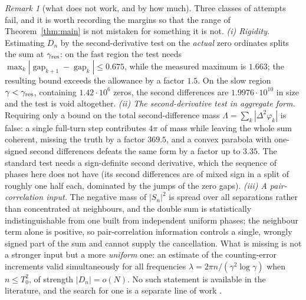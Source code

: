 \documentclass[11pt]{article}
\theoremstyle{remark}
\newtheorem{remark}[theorem]{Remark}
\begin{document}
\begin{remark}[what does not work, and by how much]\label{rem:negative}
Three classes of attempts fail, and it is worth recording the margins so that the range of
Theorem~\ref{thm:main} is not mistaken for something it is not.
\emph{(i) Rigidity.} Estimating $D_n$ by the second-derivative test on the \emph{actual} zero
ordinates splits the sum at $\gamma_{\rm res}$: on the fast region the test needs
$\max_k|\operatorname{gap}_{k+1}-\operatorname{gap}_k|\le0.675$, while the measured maximum is
$1.663$; the resulting bound exceeds the allowance by a factor $1.5$. On the slow region
$\gamma<\gamma_{\rm res}$, containing $1.42\cdot10^{6}$ zeros, the second differences are
$1.9976\cdot10^{10}$ in size and the test is void altogether.
\emph{(ii) The second-derivative test in aggregate form.} Requiring only a bound on the total
second-difference mass $\Lambda=\sum_k|\Delta^{2}\varphi_k|$ is false: a single full-turn step
contributes $4\pi$ of mass while leaving the whole sum coherent, missing the truth by a factor
$369.5$, and a convex parabola with one-signed second differences defeats the same form by a
factor up to $3.35$. The standard test needs a sign-definite second derivative, which the
sequence of phases here does not have (its second differences are of mixed sign in a split of
roughly one half each, dominated by the jumps of the zero gaps).
\emph{(iii) A pair-correlation input.} The negative mass of $|S_n|^{2}$ is spread over all
separations rather than concentrated at neighbours, and the double sum is statistically
indistinguishable from one built from independent uniform phases; the neighbour term alone is
positive, so pair-correlation information controls a single, wrongly signed part of the sum and
cannot supply the cancellation. What is missing is not a stronger input but a more \emph{uniform}
one: an estimate of the counting-error increments valid simultaneously for all frequencies
$\lambda=2\pi n/(\gamma^{2}\log\gamma)$ when $n\le T_0^{2}$, of strength $|D_n|=o(N)$.
No such statement is available in the literature, and the search for one is a separate line of
work \cite{BT26ux}.
\end{remark}
\end{document}
